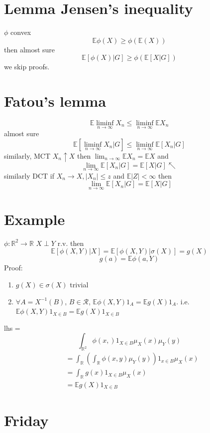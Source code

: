 \documentclass[11pt]{article}
\begin{document}
\section{Lemma Jensen's inequality}
$\phi$ convex
\[
\mathbb{E} \phi(X) \ge \phi( \mathbb{E}(X))
\] 
then almost sure
\[
 \mathbb{E}[\phi(X) | G] \ge \phi( \mathbb{E}[X | G])
\] 
we skip proofs.

\section{Fatou's lemma}
\[
\mathbb{E} \liminf_{n\to \infty} X_n \le \liminf_{n\to \infty} \mathbb{E} X_n
\] 
almost sure
\[
    \mathbb{E}[\liminf_{n\to \infty} X_n | G] \le \liminf_{n\to \infty} \mathbb{E}[X_n | G]
\] 
similarly, MCT $X_n \uparrow X$ then  $\lim_{ n\to \infty } \mathbb{E} X_n = \mathbb{E} X$ and 
\[
    \lim_{n\to \infty} \mathbb{E}[X_n | G] = \mathbb{E}[X | G] \nwarrow
\] 
similarly DCT if $X_n \rightarrow X, |X_n| \le z$ and  $ \mathbb{E}|Z| < \infty$ then
\[
    \lim_{n\to \infty} \mathbb{E}[ X_n | G] = \mathbb{E}[X | G]
\] 

\section{Example}
$\phi : \mathbb{R}^2 \rightarrow \mathbb{R}$ $X \perp Y$ r.v.
then
\[
    \mathbb{E} [\phi(X,Y) | X] =  \mathbb{E}[\phi(X,Y) | \sigma(X)] = g(X)
\] 
\[
g(a) = \mathbb{E} \phi(a,Y)
\] 
Proof: 
\begin{enumerate}
    \item $g(X) \in \sigma(X)$ trivial\\
    \item $\forall A = X^{-1}(B)$, $B \in \mathcal{R}$,  $ \mathbb{E} \phi(X,Y) 1_A = \mathbb{E} g(X) 1_A$.
        i.e. $ \mathbb{E} \phi(X,Y) 1_{X \in B} = \mathbb{E} g(X) 1_{X \in B}$
\end{enumerate}
lhs =
\[
    \int_{ \mathbb{R}^2}^{}\phi(x,) 1_{X \in B} \mu_X(x) \mu_Y(y)
\] 
\begin{align*}
    &= \int_{ \mathbb{R}}^{}\left(\int_{ \mathbb{R}}^{}\phi(x,y) \mu_Y(y)\right)1_{x \in B} \mu_X(x)\\
    &= \int_{ \mathbb{R}}^{}g(x) 1_{X \in B} \mu_X(x)\\
    &= \mathbb{E} g(X) 1_{X \in B}
\end{align*}

\section{Friday}
\end{document}
